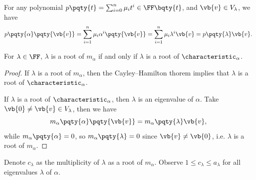 \begin{remark}
    For any polynomial \(p\pqty{t} = \sum_{i = 0}^{n} \mu_i t^i \in \FF\bqty{t}\), and \(\vb{v} \in V_{\lambda}\), we have
    \[
        p\pqty{\alpha} \pqty{\vb{v}} = \sum_{i = 1}^{n} \mu_i \alpha^i\pqty{\vb{v}} = \sum_{i = 1}^{n} \mu_i \lambda^i \vb{v} = p\pqty{\lambda} \vb{v}.
    \]
\end{remark}

\begin{lemma}
    For \(\lambda \in \FF\), \(\lambda\) is a root of \(m_{\alpha}\) if and only if \(\lambda\) is a root of \(\characteristic_{\alpha}\).
\end{lemma}

\begin{proof}
    If \(\lambda\) is a root of \(m_{\alpha}\), then the Cayley--Hamilton thorem implies that \(\lambda\) is a root of \(\characteristic_{\alpha}\).

    If \(\lambda\) is a root of \(\characteristic_{\alpha}\), then \(\lambda\) is an eigenvalue of \(\alpha\). Take \(\vb{0} \neq \vb{v} \in V_{\lambda}\), then we have
    \[
        m_{\alpha} \pqty{\alpha} \pqty{\vb{v}} = m_{\alpha} \pqty{\lambda} \vb{v},
    \]
    while \(m_{\alpha} \pqty{\alpha} = 0\), so \(m_{\alpha} \pqty{\lambda} = 0\) since \(\vb{v} \neq \vb{0}\), i.e. \(\lambda\) is a root of \(m_{\alpha}\).
\end{proof}

\begin{notation}
    Denote \(c_{\lambda}\) as the multiplicity of \(\lambda\) as a root of \(m_{\alpha}\). Observe \(1 \leq c_{\lambda} \leq a_{\lambda}\) for all eigenvalues \(\lambda\) of \(\alpha\).
\end{notation}

